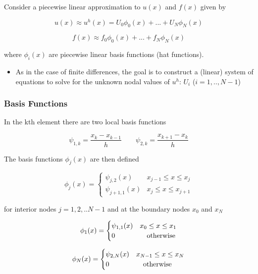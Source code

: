 \documentclass[12pt]{report}
\begin{document}
Consider a piecewise linear approximation to $u(x)$ and $f(x)$ given by

\begin{equation}\label{linappu}
u(x)\approx{u}^h(x)=U_0\phi_0(x)+...+U_N\phi_N(x)
\end{equation}

\begin{equation}\label{linappf}
f(x)\approx{f}_0\phi_0(x)+...+f_N\phi_N(x)
\end{equation}

where $\phi_i(x)$ are piecewise linear basis functions (hat functions).

\begin{itemize}
\item As in the case of finite differences, the goal is to construct a (linear) system of
equations to solve for the unknown nodal values of $u^h$: $U_i$ ($i=1,..,N-1$)
\end{itemize}

\subsubsection*{Basis Functions}

In the kth element there are two local basis functions

\begin{equation*}
\psi_{1,k}=\frac{x_{k}-x_{k-1}}{h}\qquad\psi_{2,k}=\frac{x_{k+1}-x_{k}}{h}
\end{equation*}

The basis functions $\phi_j(x)$ are then defined 

\[\phi_{j}(x)= \begin{cases} 
      \psi_{j,2}(x) & x_{j-1}\leq x\leq x_j  \\
      \psi_{j+1,1}(x) & x_{j}\leq x\leq x_{j+1} 
   \end{cases}
\]

for interior nodes $j=1,2,..N-1$ and at the boundary nodes $x_0$ and $x_{N}$ 

\[\phi_{1}(x)= \begin{cases} 
      \psi_{1,1}(x) & x_0\leq x\leq x_1 \\
       0 &  \quad\textnormal{otherwise} 
   \end{cases}
\]

\[\phi_{N}(x)= \begin{cases} 
     \psi_{2,N}(x) & x_{N-1}\leq x\leq x_{N} \\
       0 &  \quad\textnormal{otherwise} 
   \end{cases}
\]
\end{document}
